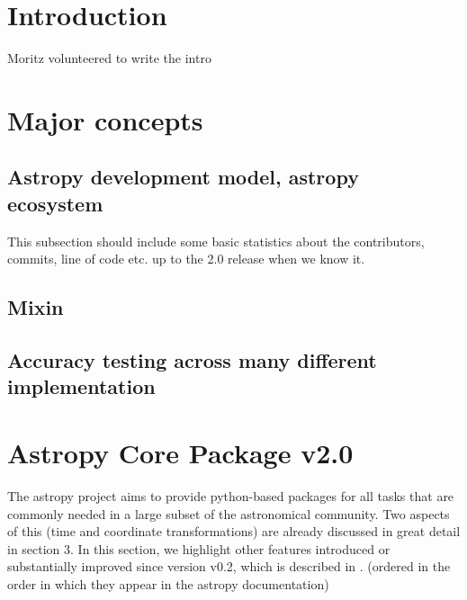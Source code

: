 \documentclass[modern]{aastex61}
\begin{document}
\keywords{}

\section{Introduction} \label{sec:intro}

Moritz volunteered to write the intro


\section{Major concepts}
\subsection{Astropy development model, astropy ecosystem}
This subsection should include some basic statistics about the contributors, commits, line of code etc. up to the 2.0 release when we know it.
\subsection{Mixin}
\subsection{Accuracy testing across many different implementation}


\section{Astropy Core Package v2.0}

The astropy project aims to provide python-based packages for all tasks that are commonly needed in a large subset of the astronomical community. Two aspects of this (time and coordinate transformations) are already discussed in great detail in section 3. In this section, we highlight other features introduced or substantially improved since version v0.2, which is described in \citet{2013A&A...558A..33A}.
(ordered in the order in which they appear in the astropy documentation)
\end{document}
